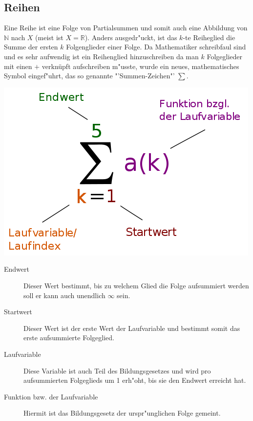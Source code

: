 \subsection{Reihen}
Eine Reihe ist eine Folge von Partialsummen und somit auch eine Abbildung von $\mathbb{N}$ nach $X$ (meist ist $X = \mathbb{R}$). Anders ausgedr"uckt, ist das $k$-te Reiheglied die Summe der ersten $k$ Folgenglieder einer Folge. Da Mathematiker schreibfaul sind und es sehr aufwendig ist ein Reihenglied hinzuschreiben da man $k$ Folgeglieder mit einen $+$ verknüpft aufschreiben m"usste, wurde ein neues, mathematisches Symbol eingef"uhrt, das so genannte "'Summen-Zeichen"' $\sum$.
\begin{minipage}{7 cm}
\includegraphics[width = 7 cm]{pictures/summe}
\begin{description}
\item[Endwert] Dieser Wert bestimmt, bis zu welchem Glied die Folge aufsummiert werden soll er kann auch unendlich $\infty$ sein.
\end{description}
\end{minipage}
\begin{minipage}{7 cm}
\begin{description}
\item[Startwert] Dieser Wert ist der erste Wert der Laufvariable und bestimmt somit das erste aufsummierte Folgeglied.
\item[Laufvariable] Diese Variable ist auch Teil des Bildungsgesetzes und wird pro aufsummierten Folgeglieds um 1 erh"oht, bis sie den Endwert erreicht hat.
\item[Funktion bzw. der Laufvariable] Hiermit ist das Bildungsgesetz der urspr"unglichen Folge gemeint.
\end{description}
\end{minipage}

